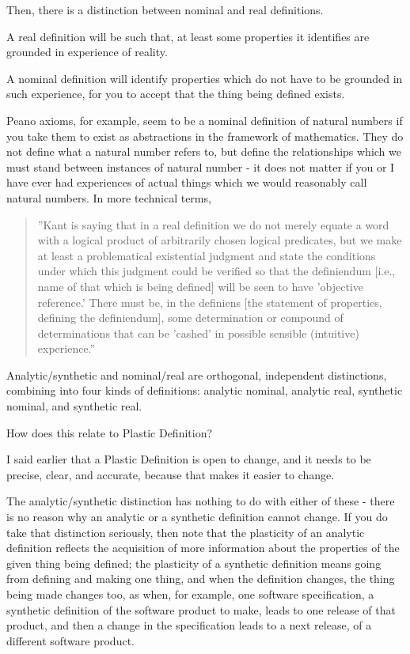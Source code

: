 \documentclass[graybox,envcountchap,sectrefs]{svmono}
\newcommand{\newdef}[1]{Plastic Definition}
\begin{document}
Then, there is a distinction between nominal and real definitions. 

A real definition will be such that, at least some properties it identifies are grounded in experience of reality. 

A nominal definition will identify properties which do not have to be grounded in such experience, for you to accept that the thing being defined exists. 

Peano axioms, for example, seem to be a nominal definition of natural numbers if you take them to exist as abstractions in the framework of mathematics. They do not define what a natural number refers to, but define the relationships which we must stand between instances of natural number - it does not matter if you or I have ever had experiences of actual things which we would reasonably call natural numbers. In more technical terms,

\begin{quote}
''Kant is saying that in a real definition we do not merely equate a word with a logical product of arbitrarily chosen logical predicates, but we make at least a problematical existential judgment and state the conditions under which this judgment could be verified so that the definiendum [i.e., name of that which is being defined] will be seen to have 'objective reference.' There must be, in the definiens [the statement of properties, defining the definiendum], some determination or compound of determinations that can be 'cashed' in possible sensible (intuitive) experience.'' \cite{beck1956kant}
\end{quote}

Analytic/synthetic and nominal/real are orthogonal, independent distinctions, combining into four kinds of definitions: analytic nominal, analytic real, synthetic nominal, and synthetic real.

How does this relate to \newdef s? 

I said earlier that a \newdef{} is open to change, and it needs to be precise, clear, and accurate, because that makes it easier to change. 

The analytic/synthetic distinction has nothing to do with either of these - there is no reason why an analytic or a synthetic definition cannot change. If you do take that distinction seriously, then note that the plasticity of an analytic definition reflects the acquisition of more information about the properties of the given thing being defined; the plasticity of a synthetic definition means going from defining and making one thing, and when the definition changes, the thing being made changes too, as when, for example, one software specification, a synthetic definition of the software product to make, leads to one release of that product, and then a change in the specification leads to a next release, of a different software product. 
\end{document}
